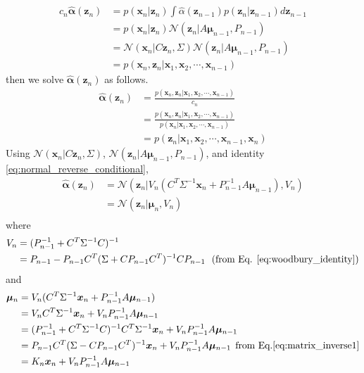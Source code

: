 \documentclass[a4]{article}
\begin{document}
\begin{equation}
\begin{aligned}
c_n\hat{\bm{\alpha}}(\bm{z}_n) &= p(\bm{x}_n|\bm{z}_n)\int\hat{\alpha}(\bm{z}_{n-1})p(\bm{z}_n|\bm{z}_{n-1})d\bm{z}_{n-1}\\
&= p(\bm{x}_n|\bm{z}_n)\mathcal{N}(\bm{z}_n|A\bm{\mu}_{n-1}, P_{n-1})\\
&= \mathcal{N}(\bm{x}_n | C\bm{z}_{n},   \Sigma)\mathcal{N}(\bm{z}_n|A\bm{\mu}_{n-1}, P_{n-1})\\
&= p(\bm{x}_n, \bm{z}_n | \bm{x}_1, \bm{x}_2, \cdots, \bm{x}_{n-1})
\end{aligned}
\end{equation}
then we solve $\hat{\bm{\alpha}}(\bm{z}_n)$ as follows.
\begin{equation}
\begin{aligned}
\hat{\bm{\alpha}}(\bm{z}_n) &= \frac{p(\bm{x}_n, \bm{z}_n | \bm{x}_1, \bm{x}_2, \cdots, \bm{x}_{n-1})}{c_n}\\
&= \frac{ p(\bm{x}_n, \bm{z}_n | \bm{x}_1, \bm{x}_2, \cdots, \bm{x}_{n-1})}
     { p(\bm{x}_n | \bm{x}_1, \bm{x}_2, \cdots, \bm{x}_{n-1})}\\
&= p(\bm{z}_n | \bm{x}_1, \bm{x}_2, \cdots, \bm{x}_{n-1}, \bm{x}_n)
\end{aligned}
\end{equation}
Using $\mathcal{N}(\bm{x}_n | C\bm{z}_{n}, \Sigma)$, $\mathcal{N}(\bm{z}_n|A\bm{\mu}_{n-1}, P_{n-1})$, and
identity \ref{eq:normal_reverse_conditional}, 
\begin{equation}
\begin{aligned}
\hat{\bm{\alpha}}(\bm{z}_n) &= \mathcal{N}(\bm{z}_n | V_n(C^T\Sigma^{-1}\bm{x}_n + P_{n-1}^{-1}A\bm{\mu}_{n-1}), V_n)\\
&= \mathcal{N}(\bm{z}_n | \bm{\mu}_n, V_n)\\
\end{aligned}
\end{equation}
where
\begin{equation}
\begin{aligned}
V_n &=(P_{n-1}^{-1} + C^T\Sigma^{-1}C)^{-1}\\
&= P_{n-1} - P_{n-1}C^T(\Sigma + CP_{n-1}C^T)^{-1}CP_{n-1} \:\:\:\text{(from Eq. \ref{eq:woodbury_identity})}\\
\end{aligned}
\end{equation}
and
\begin{equation}
\begin{aligned}
\bm{\mu}_n &= V_n(C^T\Sigma^{-1}\bm{x}_n + P_{n-1}^{-1}A\bm{\mu}_{n-1})\\
&= V_nC^T\Sigma^{-1}\bm{x}_n + V_nP_{n-1}^{-1}A\bm{\mu}_{n-1}\\
&= (P_{n-1}^{-1} + C^T\Sigma^{-1}C)^{-1}C^T\Sigma^{-1}\bm{x}_n + V_nP_{n-1}^{-1}A\bm{\mu}_{n-1}\\
&= P_{n-1}C^T(\Sigma - CP_{n-1}C^T)^{-1}\bm{x}_n + V_nP_{n-1}^{-1}A\bm{\mu}_{n-1} \:\:\text{from Eq.\ref{eq:matrix_inverse1}}\\
&= K_n\bm{x}_n + V_nP_{n-1}^{-1}A\bm{\mu}_{n-1}\\
\end{aligned}
\end{equation}
\end{document}
